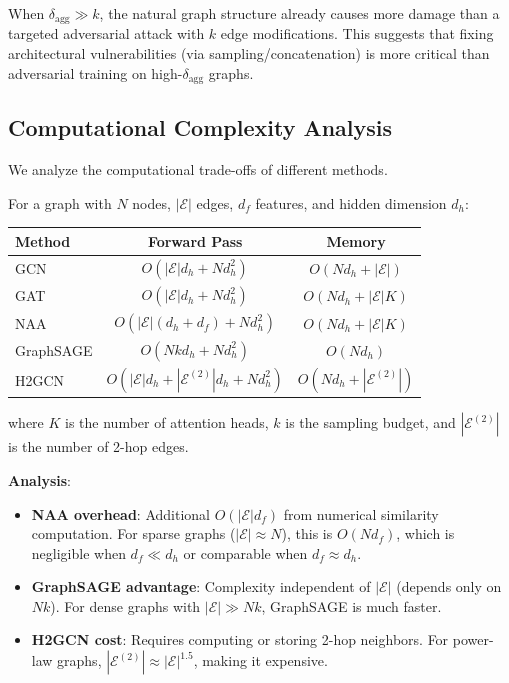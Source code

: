 \begin{remark}
When $\delta_{\text{agg}} \gg k$, the natural graph structure already causes more damage than a targeted adversarial attack with $k$ edge modifications. This suggests that fixing architectural vulnerabilities (via sampling/concatenation) is more critical than adversarial training on high-$\delta_{\text{agg}}$ graphs.
\end{remark}

\subsection{Computational Complexity Analysis}

We analyze the computational trade-offs of different methods.

\begin{proposition}
\label{prop:complexity}
For a graph with $N$ nodes, $|\mathcal{E}|$ edges, $d_f$ features, and hidden dimension $d_h$:

\begin{center}
\begin{tabular}{lcc}
\toprule
\textbf{Method} & \textbf{Forward Pass} & \textbf{Memory} \\
\midrule
GCN & $O(|\mathcal{E}|d_h + Nd_h^2)$ & $O(Nd_h + |\mathcal{E}|)$ \\
GAT & $O(|\mathcal{E}|d_h + Nd_h^2)$ & $O(Nd_h + |\mathcal{E}|K)$ \\
NAA & $O(|\mathcal{E}|(d_h + d_f) + Nd_h^2)$ & $O(Nd_h + |\mathcal{E}|K)$ \\
GraphSAGE & $O(Nkd_h + Nd_h^2)$ & $O(Nd_h)$ \\
H2GCN & $O(|\mathcal{E}|d_h + |\mathcal{E}^{(2)}|d_h + Nd_h^2)$ & $O(Nd_h + |\mathcal{E}^{(2)}|)$ \\
\bottomrule
\end{tabular}
\end{center}

where $K$ is the number of attention heads, $k$ is the sampling budget, and $|\mathcal{E}^{(2)}|$ is the number of 2-hop edges.
\end{proposition}

\textbf{Analysis}:
\begin{itemize}
\item \textbf{NAA overhead}: Additional $O(|\mathcal{E}|d_f)$ from numerical similarity computation. For sparse graphs ($|\mathcal{E}| \approx N$), this is $O(Nd_f)$, which is negligible when $d_f \ll d_h$ or comparable when $d_f \approx d_h$.
\item \textbf{GraphSAGE advantage}: Complexity independent of $|\mathcal{E}|$ (depends only on $Nk$). For dense graphs with $|\mathcal{E}| \gg Nk$, GraphSAGE is much faster.
\item \textbf{H2GCN cost}: Requires computing or storing 2-hop neighbors. For power-law graphs, $|\mathcal{E}^{(2)}| \approx |\mathcal{E}|^{1.5}$, making it expensive.
\end{itemize}

